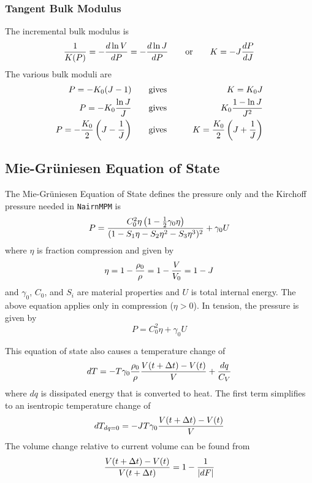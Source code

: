 \documentclass[11pt]{article}
\begin{document}
\subsubsection{Tangent Bulk Modulus}

The incremental bulk modulus is
\begin{equation}
   {1\over K(P)} = - {d\ln V\over dP} = - {d\ln J\over dP}  \qquad{\rm or} \qquad K = -J {dP\over dJ}
\end{equation}
The various bulk moduli are
\begin{eqnarray}
   P = -K_0(J-1) &\qquad{\rm gives}\qquad & K = K_0 J \\
   P = -K_0 {\ln J\over J} &\qquad{\rm gives}\qquad& K_0{1-\ln J\over J^2}\\
   P = - {K_0\over 2}\left(J-{1\over J}\right) &\qquad{\rm gives}\qquad& K = {K_0\over 2}\left(J + {1\over J}\right)
\end{eqnarray}



\subsection{Mie-Gr\"{u}niesen Equation of State}

The Mie-Gr\"{u}niesen Equation of State defines the pressure only and the Kirchoff pressure needed in {\tt NairnMPM} is
\begin{equation}
       P = {C_0^2 \eta \left(1 - {1\over 2}\gamma_0 \eta\right) \over (1 - S_1\eta - S_2\eta^2 - S_3 \eta^3)^2} + \gamma_0 U
\end{equation}
where $\eta$ is fraction compression and given by
\begin{equation}
    \eta = 1 - {\rho_0\over \rho} = 1 - {V\over V_0} = 1 - J
\end{equation}
and $\gamma_0$, $C_0$, and $S_i$ are material properties and $U$ is total internal energy. The above equation applies only in compression ($\eta>0$). In tension, the pressure is given by
\begin{equation}
      P = C_0^2\eta + \gamma_0 U
\end{equation}

This equation of state also causes a temperature change of
\begin{equation}
     dT = - T \gamma_0 {\rho_0\over \rho} {V(t+\Delta t)-V(t)\over V} + {dq \over C_V}
\end{equation}
where $dq$ is dissipated energy that is converted to heat. The first term simplifies to an isentropic temperature change of
\begin{equation}
     dT_{dq=0} = - JT \gamma_0  {V(t+\Delta t)-V(t)\over V} 
\end{equation}
The volume change relative to current volume can be found from
\begin{equation}
     {V(t+\Delta t)-V(t)\over V(t+\Delta t)} =1 - {1\over |dF|}
\end{equation}
\end{document}
